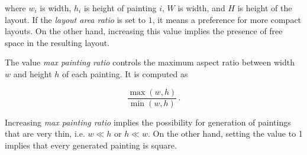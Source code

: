 where $w_i$ is width, $h_i$ is height of painting $i$, $W$ is width, and $H$ is height of the layout.
If the \textit{layout area ratio} is set to $1$, it means a preference for more compact layouts. On the other hand,
increasing this value implies the presence of free space in the resulting layout.

The value \textit{max painting ratio} controls the maximum aspect ratio between width $w$ and height $h$ of each painting.
It is computed as

\[
    \dfrac{\max(w,h)}{\min(w,h)}\,.
\]

Increasing \textit{max painting ratio} implies the possibility for generation of paintings
that are very thin, i.e. $w \ll h$ or $h \ll w$. On the other hand, setting the value to 1
implies that every generated painting is square.

